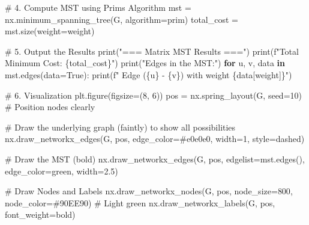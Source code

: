 \documentclass[
  letterpaper,
  DIV=11,
  numbers=noendperiod]{scrreprt}
\newenvironment{Shaded}{\begin{snugshade}}{\end{snugshade}}
\newcommand{\BuiltInTok}[1]{\textcolor[rgb]{0.00,0.23,0.31}{#1}}
\newcommand{\CommentTok}[1]{\textcolor[rgb]{0.37,0.37,0.37}{#1}}
\newcommand{\ControlFlowTok}[1]{\textcolor[rgb]{0.00,0.23,0.31}{\textbf{#1}}}
\newcommand{\DecValTok}[1]{\textcolor[rgb]{0.68,0.00,0.00}{#1}}
\newcommand{\FloatTok}[1]{\textcolor[rgb]{0.68,0.00,0.00}{#1}}
\newcommand{\KeywordTok}[1]{\textcolor[rgb]{0.00,0.23,0.31}{\textbf{#1}}}
\newcommand{\NormalTok}[1]{\textcolor[rgb]{0.00,0.23,0.31}{#1}}
\newcommand{\OperatorTok}[1]{\textcolor[rgb]{0.37,0.37,0.37}{#1}}
\newcommand{\SpecialCharTok}[1]{\textcolor[rgb]{0.37,0.37,0.37}{#1}}
\newcommand{\SpecialStringTok}[1]{\textcolor[rgb]{0.13,0.47,0.30}{#1}}
\newcommand{\StringTok}[1]{\textcolor[rgb]{0.13,0.47,0.30}{#1}}
\newcommand{\VariableTok}[1]{\textcolor[rgb]{0.07,0.07,0.07}{#1}}
\begin{document}
\begin{Shaded}
\begin{Highlighting}[]
\CommentTok{\# 4. Compute MST using Prim\textquotesingle{}s Algorithm}
\NormalTok{mst }\OperatorTok{=}\NormalTok{ nx.minimum\_spanning\_tree(G, algorithm}\OperatorTok{=}\StringTok{\textquotesingle{}prim\textquotesingle{}}\NormalTok{)}
\NormalTok{total\_cost }\OperatorTok{=}\NormalTok{ mst.size(weight}\OperatorTok{=}\StringTok{\textquotesingle{}weight\textquotesingle{}}\NormalTok{)}

\CommentTok{\# 5. Output the Results}
\BuiltInTok{print}\NormalTok{(}\StringTok{"=== Matrix MST Results ==="}\NormalTok{)}
\BuiltInTok{print}\NormalTok{(}\SpecialStringTok{f"Total Minimum Cost: }\SpecialCharTok{\{}\NormalTok{total\_cost}\SpecialCharTok{\}}\SpecialStringTok{"}\NormalTok{)}
\BuiltInTok{print}\NormalTok{(}\StringTok{"Edges in the MST:"}\NormalTok{)}
\ControlFlowTok{for}\NormalTok{ u, v, data }\KeywordTok{in}\NormalTok{ mst.edges(data}\OperatorTok{=}\VariableTok{True}\NormalTok{):}
    \BuiltInTok{print}\NormalTok{(}\SpecialStringTok{f"  Edge (}\SpecialCharTok{\{}\NormalTok{u}\SpecialCharTok{\}}\SpecialStringTok{ {-} }\SpecialCharTok{\{}\NormalTok{v}\SpecialCharTok{\}}\SpecialStringTok{) with weight }\SpecialCharTok{\{}\NormalTok{data[}\StringTok{\textquotesingle{}weight\textquotesingle{}}\NormalTok{]}\SpecialCharTok{\}}\SpecialStringTok{"}\NormalTok{)}

\CommentTok{\# 6. Visualization}
\NormalTok{plt.figure(figsize}\OperatorTok{=}\NormalTok{(}\DecValTok{8}\NormalTok{, }\DecValTok{6}\NormalTok{))}
\NormalTok{pos }\OperatorTok{=}\NormalTok{ nx.spring\_layout(G, seed}\OperatorTok{=}\DecValTok{10}\NormalTok{) }\CommentTok{\# Position nodes clearly}

\CommentTok{\# Draw the underlying graph (faintly) to show all possibilities}
\NormalTok{nx.draw\_networkx\_edges(G, pos, edge\_color}\OperatorTok{=}\StringTok{\textquotesingle{}\#e0e0e0\textquotesingle{}}\NormalTok{, width}\OperatorTok{=}\DecValTok{1}\NormalTok{, style}\OperatorTok{=}\StringTok{\textquotesingle{}dashed\textquotesingle{}}\NormalTok{)}

\CommentTok{\# Draw the MST (bold)}
\NormalTok{nx.draw\_networkx\_edges(G, pos, edgelist}\OperatorTok{=}\NormalTok{mst.edges(), edge\_color}\OperatorTok{=}\StringTok{\textquotesingle{}green\textquotesingle{}}\NormalTok{, width}\OperatorTok{=}\FloatTok{2.5}\NormalTok{)}

\CommentTok{\# Draw Nodes and Labels}
\NormalTok{nx.draw\_networkx\_nodes(G, pos, node\_size}\OperatorTok{=}\DecValTok{800}\NormalTok{, node\_color}\OperatorTok{=}\StringTok{\textquotesingle{}\#90EE90\textquotesingle{}}\NormalTok{) }\CommentTok{\# Light green}
\NormalTok{nx.draw\_networkx\_labels(G, pos, font\_weight}\OperatorTok{=}\StringTok{\textquotesingle{}bold\textquotesingle{}}\NormalTok{)}


\end{Highlighting}
\end{Shaded}
\end{document}
